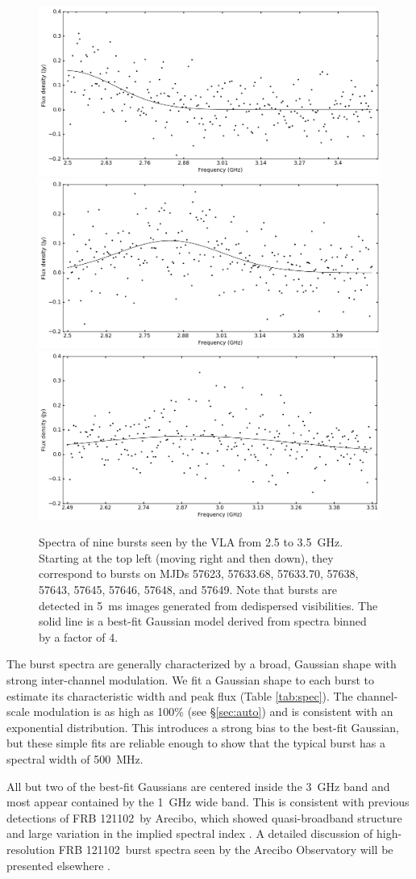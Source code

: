 \documentclass[twocolumn]{aastex61}
\newcommand{\frb}{FRB 121102}
\begin{document}
\begin{figure}[ht]
\begin{center}
 \begin{minipage}{2\columnwidth}
  \includegraphics[width=0.33\columnwidth]{spec_57646.png}
  \includegraphics[width=0.33\columnwidth]{spec_57648.png}
  \includegraphics[width=0.33\columnwidth]{spec_57649.png}
 \end{minipage}
\caption{Spectra of nine bursts seen by the VLA from 2.5 to 3.5~GHz. Starting at the top left (moving right and then down), they correspond to bursts on MJDs 57623, 57633.68, 57633.70, 57638, 57643, 57645, 57646, 57648, and 57649. Note that bursts are detected in 5~ms images generated from dedispersed visibilities.
The solid line is a best-fit Gaussian model derived from spectra binned by a factor of 4.
\label{fig:spec}}
\end{center}
\end{figure}

The burst spectra are generally characterized by a broad, Gaussian shape with strong inter-channel modulation. We fit a Gaussian shape to each burst to estimate its characteristic width and peak flux (Table \ref{tab:spec}). The channel-scale modulation is as high as 100\% (see \S \ref{sec:auto}) and is consistent with an exponential distribution. This introduces a strong bias to the best-fit Gaussian, but these simple fits are reliable enough to show that the typical burst has a spectral width of 500~MHz.

All but two of the best-fit Gaussians are centered inside the 3~GHz band and most appear contained by the 1~GHz wide band. This is consistent with previous detections of \frb\ by Arecibo, which showed quasi-broadband structure \citep{2016arXiv160308880S} and large variation in the implied spectral index \citep{2014ApJ...790..101S}. A detailed discussion of high-resolution \frb\ burst spectra seen by the Arecibo Observatory will be presented elsewhere \citep{WEIRD}.
\end{document}
